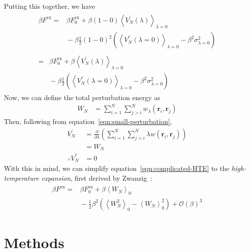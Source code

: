 \documentclass[letterpaper,twocolumn,amsmath,amssymb,prb]{revtex4-1}
\newcommand{\1}{\ensuremath{\textbf{r}_1}}
\newcommand{\2}{\ensuremath{\textbf{r}_2}}
\begin{document}
Putting this together, we have
\begin{align}
  \begin{split}
    \beta F^\text{ex} = &{} \beta F^\text{ex}_0 + \beta(1 - 0)\left\langle V_N^{'}(\lambda) \right\rangle_{\lambda = 0} \\ &{} - \beta\frac{1}{2}(1 - 0)^2\left(\left\langle V_N^{''}(\lambda = 0) \right\rangle_{\lambda = 0} - \beta^2\sigma^2_{\lambda = 0} \right)
  \end{split} \\
  \begin{split}
    =&{}  \beta F^\text{ex}_0 + \beta\left\langle V_N^{'}(\lambda) \right\rangle_{\lambda = 0} \\ &{} - \beta\frac{1}{2}\left(\left\langle V_N^{''}(\lambda = 0) \right\rangle_{\lambda = 0} - \beta^2\sigma^2_{\lambda = 0} \right) \label{eqn:complicated-HTE}
  \end{split}
\end{align}
Now, we can define the total perturbation energy as
\begin{align}
  W_N &= \sum_{i=1}^N\sum_{j>i}^N w_\lambda(\mathbf{r}_i,\mathbf{r}_j)
\end{align}
Then, following from equation~\ref{eqn:small-perturbation},
\begin{align}
  V_N^{'} &= \frac{\partial}{\partial\lambda}\left(\sum_{i=1}^N\sum_{j>i}^N \lambda w(\mathbf{r}_i,\mathbf{r}_j)\right) \\
  &= W_N \\
  \therefore V_N^{''} &= 0
\end{align}
With this in mind, we can simplify equation~\ref{eqn:complicated-HTE} to the \emph{high-temperature expansion}, first derived by Zwanzig~\cite{Zwanzig54}:
\begin{align}
  \begin{split}
    \beta F^\text{ex} = &{} \beta F^\text{ex}_0 + \beta\left\langle W_N \right\rangle_0  \\ &{} - \frac{1}{2}\beta^2\left( \left\langle W_N^2 \right\rangle_0 - \left\langle W_N \right\rangle_0^2 \right) + \mathcal{O}(\beta)^3
  \end{split}
\end{align}

\section{Methods}\label{sec:methods}
\end{document}
